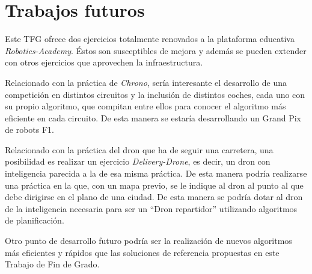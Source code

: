 \section{Trabajos futuros} 
Este TFG ofrece dos ejercicios totalmente renovados a la plataforma educativa \textit{Robotics-Academy}. Éstos son susceptibles de mejora y además se pueden extender con otros ejercicios que aprovechen la infraestructura.

Relacionado con la práctica de \textit{Chrono}, sería interesante el desarrollo de una competición en distintos circuitos y la inclusión de distintos coches, cada uno con su propio algoritmo, que compitan entre ellos para conocer el algoritmo más eficiente en cada circuito. De esta manera se estaría desarrollando un Grand Pix de robots F1.

Relacionado con la práctica del dron que ha de seguir una carretera, una posibilidad es realizar un ejercicio \textit{Delivery-Drone}, es decir, un dron con inteligencia parecida a la de esa misma práctica. De esta manera podría realizarse una práctica en la que, con un mapa previo, se le indique al dron al punto al que debe dirigirse en el plano de una ciudad. De esta manera se podría dotar al dron de la inteligencia necesaria para ser un ``Dron repartidor'' utilizando algoritmos de planificación.

Otro punto de desarrollo futuro podría ser la realización de nuevos algoritmos más eficientes y rápidos que las soluciones de referencia propuestas en este Trabajo de Fin de Grado.